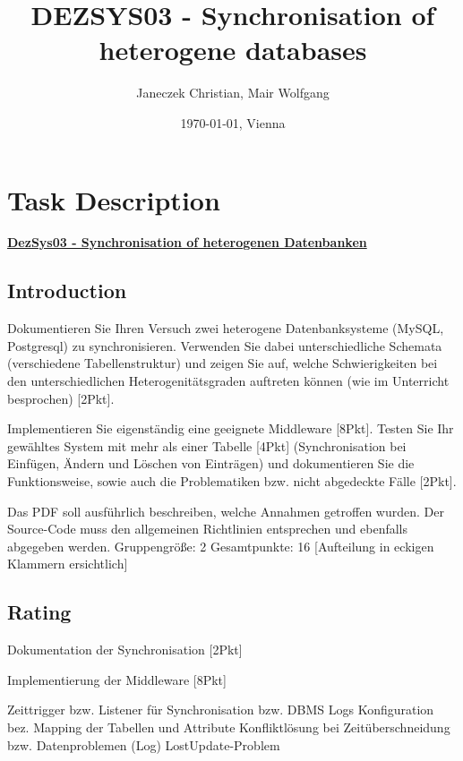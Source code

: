 \documentclass[11pt,a4paper]{article}
\title{\bf DEZSYS03 - Synchronisation of heterogene databases}
\author{Janeczek Christian, Mair Wolfgang}
\affil{IT Department TGM, Vienna}
\date{\today{}, Vienna}
\begin{document}
\maketitle
\pagestyle{fancy}
\fancyhf{}
\newpage
\tableofcontents
{}
\newpage

\section{Task Description}
\textbf{\underline{DezSys03 - Synchronisation of heterogenen Datenbanken}}

\subsection{Introduction}

Dokumentieren Sie Ihren Versuch zwei heterogene Datenbanksysteme (MySQL, Postgresql) zu synchronisieren. Verwenden Sie dabei unterschiedliche Schemata (verschiedene Tabellenstruktur) und zeigen Sie auf, welche Schwierigkeiten bei den unterschiedlichen Heterogenitätsgraden auftreten können (wie im Unterricht besprochen) [2Pkt].

\noindent Implementieren Sie eigenständig eine geeignete Middleware [8Pkt]. Testen Sie Ihr gewähltes System mit mehr als einer Tabelle [4Pkt] (Synchronisation bei Einfügen, Ändern und Löschen von Einträgen) und dokumentieren Sie die Funktionsweise, sowie auch die Problematiken bzw. nicht abgedeckte Fälle [2Pkt].

\noindent Das PDF soll ausführlich beschreiben, welche Annahmen getroffen wurden. Der Source-Code muss den allgemeinen Richtlinien entsprechen und ebenfalls abgegeben werden.
\newline\newline
\noindent Gruppengröße: 2 
\newline
\noindent Gesamtpunkte: 16 [Aufteilung in eckigen Klammern ersichtlich]

\subsection{Rating}

Dokumentation der Synchronisation [2Pkt]

\noindent Implementierung der Middleware [8Pkt]

\noindent Zeittrigger bzw. Listener für Synchronisation bzw. DBMS Logs
Konfiguration bez. Mapping der Tabellen und Attribute
Konfliktlösung bei Zeitüberschneidung bzw. Datenproblemen (Log)
LostUpdate-Problem
\end{document}
